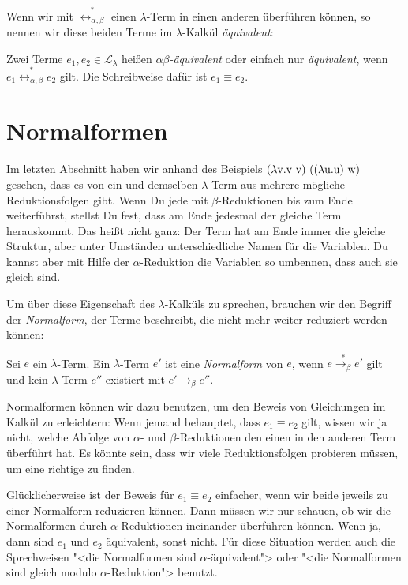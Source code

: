 Wenn wir mit $\overset{\ast}{\leftrightarrow_{\alpha,\beta}}$ einen
$\lambda$-Term in einen anderen überführen können, so nennen wir diese
beiden Terme im $\lambda$-Kalkül 
\textit{äquivalent}:
%
\begin{definition}
  Zwei Terme $e_1, e_2\in\mathcal{L}_{\lambda}$ heißen
  \textit{$\alpha\beta$-äquivalent} oder einfach nur
  \textit{äquivalent}, wenn
  \(e_1 \overset{\ast}{\leftrightarrow_{\alpha,\beta}} e_2\)
  gilt.
  Die Schreibweise dafür ist \(e_1\equiv e_2\).
\end{definition}

\section{Normalformen}
\label{sec:normalformen}


Im letzten Abschnitt haben wir anhand des Beispiels
$
(\lambda \mathrm v .\mathrm v~\mathrm v)~((\lambda \mathrm u.\mathrm u)~\mathrm w)
$
%
gesehen, dass es von ein und demselben $\lambda$-Term aus mehrere
mögliche Reduktionsfolgen gibt.  Wenn Du jede mit $\beta$-Reduktionen
bis zum Ende weiterführst, stellst Du fest, dass am Ende jedesmal der
gleiche Term herauskommt.  Das heißt nicht ganz: Der Term hat am Ende
immer die gleiche Struktur, aber unter Umständen unterschiedliche
Namen für die Variablen.  Du kannst aber mit Hilfe der
$\alpha$-Reduktion die Variablen so umbennen, dass auch sie gleich sind.

Um über diese Eigenschaft des $\lambda$-Kalküls zu sprechen, brauchen
wir den Begriff der \textit{Normalform}, der Terme beschreibt, die
nicht mehr weiter reduziert werden können:
%
\begin{definition}[Normalform]
  Sei $e$ ein $\lambda$-Term.  Ein $\lambda$-Term $e'$ ist eine
  \textit{Normalform} von $e$, wenn
  $e\overset{\ast}{\rightarrow_\beta}e'$ gilt und kein $\lambda$-Term
  $e''$ existiert mit
  $e'\rightarrow_\beta e''$.
\end{definition}
%
Normalformen können wir dazu benutzen, um den Beweis von Gleichungen
im Kalkül zu erleichtern: Wenn jemand behauptet, dass $e_1 \equiv e_2$
gilt, wissen wir ja nicht, welche Abfolge von $\alpha$- und
$\beta$-Reduktionen den einen in den anderen Term überführt hat.  Es
könnte sein, dass wir viele Reduktionsfolgen probieren müssen, um eine
richtige zu finden.

Glücklicherweise ist der Beweis für $e_1 \equiv e_2$ einfacher, wenn
wir beide jeweils zu einer Normalform reduzieren können.  Dann müssen
wir nur schauen, ob wir die Normalformen durch $\alpha$-Reduktionen
ineinander überführen können.  Wenn ja, dann sind $e_1$ und $e_2$
äquivalent, sonst nicht.  Für diese Situation werden auch die
Sprechweisen "<die Normalformen sind $\alpha$-äquivalent"> oder "<die
Normalformen sind gleich modulo $\alpha$-Reduktion"> benutzt.



